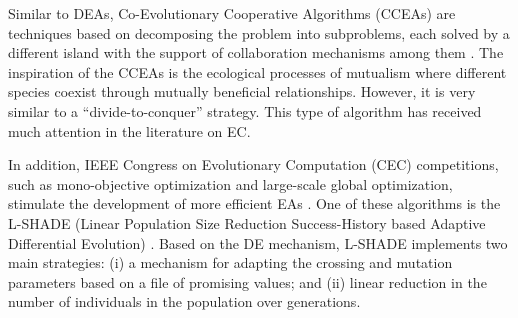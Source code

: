 			Similar to DEAs, Co-Evolutionary Cooperative Algorithms (CCEAs) are techniques based on decomposing the problem into subproblems, each solved by a different island with the support of collaboration mechanisms among them \citep{ma2019survey}. The inspiration of the CCEAs is the ecological processes of mutualism where different species coexist through mutually beneficial relationships. However, it is very similar to a ``divide-to-conquer'' strategy. This type of algorithm has received much attention in the literature on EC.
			
			In addition, IEEE Congress on Evolutionary Computation (CEC) competitions, such as mono-objective optimization and large-scale global optimization, stimulate the development of more efficient EAs \citep{molina2018shade,li2019differential,sun2019decomposition}. One of these algorithms is the L-SHADE (Linear Population Size Reduction Success-History based Adaptive Differential Evolution) \citep{tanabe2014improving}. Based on the DE mechanism, L-SHADE implements two main strategies: (i) a mechanism for adapting the crossing and mutation parameters based on a file of promising values; and (ii) linear reduction in the number of individuals in the population over generations.
			
